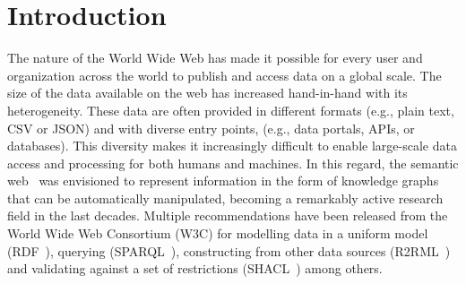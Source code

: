\chapter{Introduction}
\label{chapter:intro}





The nature of the World Wide Web has made it possible for every user and organization across the world to publish and access data on a global scale. 
The size of the data available on the web has increased hand-in-hand with its heterogeneity. 
These data are often provided in different formats (e.g., plain text, CSV or JSON) and with diverse entry points, (e.g., data portals, APIs, or databases). 
This diversity makes it increasingly difficult to enable large-scale data access and processing for both humans and machines.
In this regard, the semantic web~\parencite{berners2001semantic} was envisioned to represent information in the form of knowledge graphs that can be automatically manipulated, becoming a remarkably active research field in the last decades.
Multiple recommendations have been released from the World Wide Web Consortium (W3C) for modelling data in a uniform model (RDF~\parencite{rdf}), querying (SPARQL~\parencite{harris2013sparql}), constructing from other data sources (R2RML~\parencite{das2012r2rml}) and validating against a set of restrictions (SHACL~\parencite{SHACL}) among others. 


